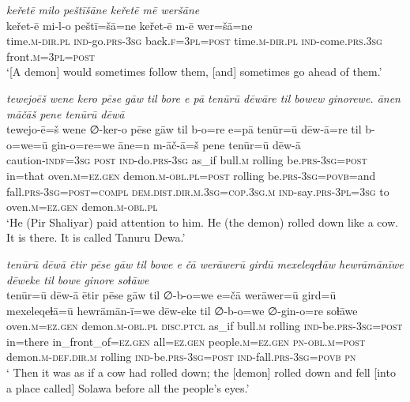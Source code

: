 \ea \label{ŽP.193}
\textit{keřetē milo peštīšāne keřetē mē weršāne} \\ 
\gll keřet-ē mi-l-o peštī=šā=ne keřet-ē m-ē wer=šā=ne \\ 
 time\textsc{.m}\textsc{-dir}\textsc{.pl} \textsc{ind-}go\textsc{.prs}\textsc{-3sg} back\textsc{.f}\textsc{=3pl}\textsc{=\textsc{post}} time\textsc{.m}\textsc{-dir}\textsc{.pl} \textsc{ind-}come\textsc{.prs}\textsc{.3sg} front\textsc{.m}\textsc{=3pl}\textsc{=\textsc{post}} \\ 
\glt `[A demon] would sometimes follow them, [and] sometimes go ahead of them.'
\z 
 
\ea \label{ŽP.200}
\textit{tewejoēš wene kero pēse gāw til bore e pā tenūrū dēwāre til bowew ginorewe. ānen māčāš pene tenūrū dēwā} \\ 
\gll tewejo-ē=š wene ∅-ker-o pēse gāw til b-o=re e=pā tenūr=ū dēw-ā=re til b-o=we=ū gin-o=re=we āne=n m-āč-ā=š pene tenūr=ū dēw-ā \\ 
 caution\textsc{-indf}\textsc{=3sg} \textsc{post} \textsc{ind-}do\textsc{.prs}\textsc{-3sg} as\_if bull\textsc{.m} rolling be\textsc{.prs}\textsc{-3sg}\textsc{=\textsc{post}} in=that oven\textsc{.m}\textsc{\textsc{=ez.gen}} demon\textsc{.m}\textsc{-obl}\textsc{.pl}\textsc{=\textsc{post}} rolling be\textsc{.prs}\textsc{-3sg}\textsc{=\textsc{povb}}=and fall\textsc{.prs}\textsc{-3sg}\textsc{=\textsc{post}}\textsc{=compl} \textsc{dem.dist}\textsc{.dir}\textsc{.m}\textsc{.3sg}\textsc{=cop}\textsc{.3sg}\textsc{.m} \textsc{ind-}say\textsc{.prs}\textsc{-3pl}\textsc{=3sg} to oven\textsc{.m}\textsc{\textsc{=ez.gen}} demon\textsc{.m}\textsc{-obl}\textsc{.pl} \\ 
\glt `He (Pir Shaliyar) paid attention to him. He (the demon) rolled down like a cow. It is there. It is called Tanuru Dewa.'
\z 
 
\ea \label{ŽP.201}
\textit{tenūrū dēwā ētir pēse gāw til bowe e čā werāwerū girdū mexeleqeɫāw hewrāmānīwe dēweke til bowe ginore soɫāwe} \\ 
\gll tenūr=ū dēw-ā ētir pēse gāw til ∅-b-o=we e=čā werāwer=ū gird=ū mexeleqeɫā=ū hewrāmān-ī=we dēw-eke til ∅-b-o=we ∅-gin-o=re soɫāwe \\ 
 oven\textsc{.m}\textsc{\textsc{=ez.gen}} demon\textsc{.m}\textsc{-obl}\textsc{.pl} \textsc{disc.ptcl} as\_if bull\textsc{.m} rolling \textsc{ind-}be\textsc{.prs}\textsc{-3sg}\textsc{=\textsc{post}} in=there in\_front\_of\textsc{\textsc{=ez.gen}} all\textsc{\textsc{=ez.gen}} people\textsc{.m}\textsc{\textsc{=ez.gen}} \textsc{pn}\textsc{-obl}\textsc{.m}\textsc{=\textsc{post}} demon\textsc{.m}\textsc{-def}\textsc{.dir}\textsc{.m} rolling \textsc{ind-}be\textsc{.prs}\textsc{-3sg}\textsc{=\textsc{post}} \textsc{ind-}fall\textsc{.prs}\textsc{-3sg}\textsc{=\textsc{povb}} \textsc{pn} \\ 
\glt ` Then it was as if a cow had rolled down; the [demon] rolled down and fell [into a place called] Solawa before all the people’s eyes.'
\z 
 
